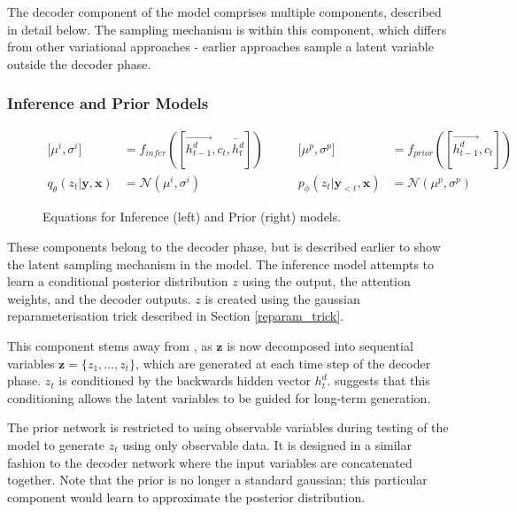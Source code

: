 \documentclass[12pt,twoside]{report}
\begin{document}
The decoder component of the model comprises multiple components, described in detail below. The sampling mechanism is within this component, which  differs from other variational approaches - earlier approaches sample a latent variable outside the decoder phase.

\subsubsection{Inference and Prior Models}

\begin{figure}[!ht]
	\label{eqn:inf_prior}
	\begin{equation}
		\begin{split}
			\lbrack \mu^i, \sigma^i \rbrack &=
			f_{infer}([\overrightarrow{h^d_{t-1}}, c_t, \overleftarrow{h^d_t}])
			\\
			q_{\theta}(z_t|\boldsymbol{y}, \boldsymbol{x}) &= \mathcal{N}(\mu^i, \sigma^i)
		\end{split}
		\quad\quad
		\begin{split}
			\lbrack \mu^p, \sigma^p \rbrack &=
			f_{prior}([\overrightarrow{h^d_{t-1}}, c_t])
			\\
			p_{\phi}(z_t|\boldsymbol{y}_{<t}, \boldsymbol{x}) &= \mathcal{N}(\mu^p, \sigma^p)
		\end{split}
	\end{equation}
	\caption{Equations for Inference (left) and Prior (right) models.}
	\end{figure}

These components belong to the decoder phase, but is described earlier to show the latent sampling mechanism in the model. The inference model attempts to learn a conditional posterior distribution $z$ using the output, the attention weights, and the decoder outputs. $z$ is created using the gaussian reparameterisation trick described in Section \ref{reparam_trick}.

This component stems away from \cite{zhao_learning_2017}, as $\boldsymbol{z}$ is now decomposed into sequential variables $\boldsymbol{z} = \{z_1,...,z_t\}$, which are generated at each time step of the decoder phase. $z_t$ is conditioned by the backwards hidden vector $h^d_{t}$. \cite{du_variational_2018} suggests that this conditioning allows the latent variables to be guided for long-term generation.

The prior network is restricted to using observable variables during testing of the model to generate $z_t$ using only observable data. It is designed in a similar fashion to the decoder network where the input variables are concatenated together. Note that the prior is no longer a standard gaussian; this particular component would learn to approximate the posterior distribution.
\end{document}
